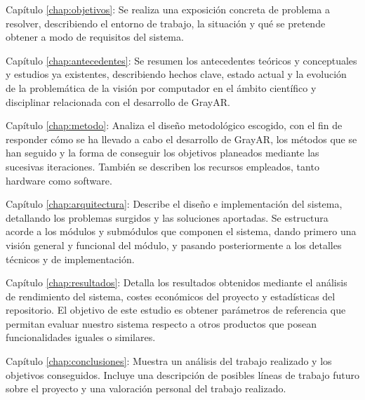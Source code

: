  \begin{definitionlist}
  \item[Capítulo \ref{chap:objetivos}: \nameref{chap:objetivos}] Se realiza una exposición concreta de problema a resolver, describiendo el entorno de trabajo, la situación y qué se pretende obtener a modo de requisitos del sistema.

  \item[Capítulo \ref{chap:antecedentes}: \nameref{chap:antecedentes}] Se resumen los antecedentes teóricos y conceptuales y estudios ya existentes, describiendo hechos clave, estado actual y la evolución de la problemática de la visión por computador en el ámbito científico y disciplinar relacionada con el desarrollo de GrayAR.

  \item[Capítulo \ref{chap:metodo}: \nameref{chap:metodo}] Analiza el diseño metodológico escogido, con el fin de responder cómo se ha llevado a cabo el desarrollo de GrayAR, los métodos que se han seguido y la forma de conseguir los objetivos planeados mediante las sucesivas iteraciones. También se describen los recursos empleados, tanto hardware como software.

  \item[Capítulo \ref{chap:arquitectura}: \nameref{chap:arquitectura}] Describe el diseño e implementación del sistema, detallando los problemas surgidos y las soluciones aportadas. Se estructura acorde a los módulos y submódulos que componen el sistema, dando primero una visión general y funcional del módulo, y pasando posteriormente a los detalles técnicos y de implementación. 

  \item[Capítulo \ref{chap:resultados}: \nameref{chap:resultados}] Detalla los resultados obtenidos mediante el análisis de rendimiento del sistema, costes económicos del proyecto y estadísticas del repositorio. El objetivo de este estudio es obtener parámetros de referencia que permitan evaluar nuestro sistema respecto a otros productos que posean funcionalidades iguales o similares.

  \item[Capítulo \ref{chap:conclusiones}: \nameref{chap:conclusiones}] Muestra un análisis del trabajo realizado y los objetivos conseguidos. Incluye una descripción de posibles líneas de trabajo futuro sobre el proyecto y una valoración personal del trabajo realizado.

  \end{definitionlist}



